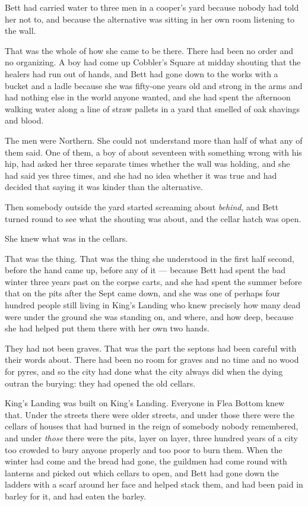 Bett had carried water to three men in a cooper’s yard because nobody had told her not to, and because the alternative was sitting in her own room listening to the wall.

That was the whole of how she came to be there. There had been no order and no organizing. A boy had come up Cobbler’s Square at midday shouting that the healers had run out of hands, and Bett had gone down to the works with a bucket and a ladle because she was fifty-one years old and strong in the arms and had nothing else in the world anyone wanted, and she had spent the afternoon walking water along a line of straw pallets in a yard that smelled of oak shavings and blood.

The men were Northern. She could not understand more than half of what any of them said. One of them, a boy of about seventeen with something wrong with his hip, had asked her three separate times whether the wall was holding, and she had said yes three times, and she had no idea whether it was true and had decided that saying it was kinder than the alternative.

Then somebody outside the yard started screaming about \textit{behind}, and Bett turned round to see what the shouting was about, and the cellar hatch was open.

\sceneBreak

She knew what was in the cellars.

That was the thing. That was the thing she understood in the first half second, before the hand came up, before any of it — because Bett had spent the bad winter three years past on the corpse carts, and she had spent the summer before that on the pits after the Sept came down, and she was one of perhaps four hundred people still living in King’s Landing who knew precisely how many dead were under the ground she was standing on, and where, and how deep, because she had helped put them there with her own two hands.

They had not been graves. That was the part the septons had been careful with their words about. There had been no room for graves and no time and no wood for pyres, and so the city had done what the city always did when the dying outran the burying: they had opened the old cellars.

King’s Landing was built on King’s Landing. Everyone in Flea Bottom knew that. Under the streets there were older streets, and under those there were the cellars of houses that had burned in the reign of somebody nobody remembered, and under \textit{those} there were the pits, layer on layer, three hundred years of a city too crowded to bury anyone properly and too poor to burn them. When the winter had come and the bread had gone, the guildmen had come round with lanterns and picked out which cellars to open, and Bett had gone down the ladders with a scarf around her face and helped stack them, and had been paid in barley for it, and had eaten the barley.

